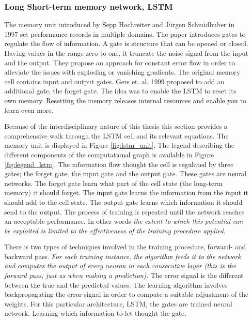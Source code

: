 \documentclass{article}
\begin{document}
\subsubsection{Long Short-term memory network, LSTM} \label{sec:lstm}
The memory unit introduced by Sepp Hochreiter and Jürgen Schmidhuber in 1997 set performance records in multiple domains. The paper introduces gates to regulate the flow of information. A gate is structure that can be opened or closed. Having values in the range zero to one, it truncate the noise signal from the input and the output. They propose an approach for constant error flow in order to alleviate the issues with exploding or vanishing gradients. The original memory cell contains input and output gates. Gers et. al. 1999 proposed to add an additional gate, the forget gate. The idea was to enable the LSTM to reset its own memory. Resetting the memory releases internal resources and enable you to learn even more.

Because of the interdisciplinary nature of this thesis this section provides a comprehensive walk through the LSTM cell and its relevant equations. The memory unit is displayed in Figure \ref{fig:lstm_unit}. The legend describing the different components of the computational graph is available in Figure \ref{fig:legend_lstm}. The information flow thought the cell is regulated by three gates; the forget gate, the input gate and the output gate. These gates are neural networks. The forget gate learn what part of the cell state (the long-term memory) it should forget. The input gate learns the information from the input it should add to the cell state. The output gate learns which information it should send to the output. The process of training is repeated until the network reaches an acceptable performance. In other words \textit{the extent to which this potential can be exploited is limited to the effectiveness of the training procedure applied}. 

There is two types of techniques involved in the training procedure, forward- and backward pass. \textit{For each training instance, the algorithm feeds it to the network and computes the output of every neuron in each consecutive layer (this is the forward pass, just as when making a prediction).} %
The error signal is the different between the true and the predicted values. The learning algorithm involves backpropagating the error signal in order to compute a suitable adjustment of the weights. For this particular architecture, LSTM, the gates are trained neural network. Learning which information to let thought the gate.
\end{document}
